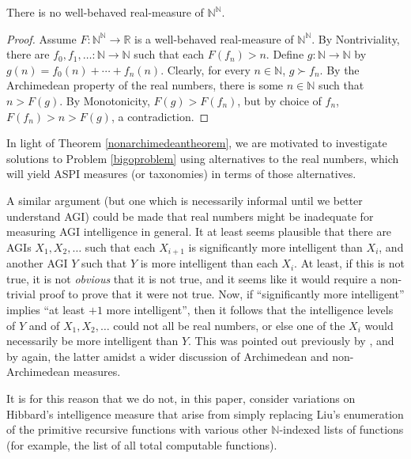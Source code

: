 \documentclass[twoside,11pt]{article}
\begin{document}
\begin{theorem}
\label{nonarchimedeantheorem}
    There is no well-behaved real-measure of $\mathbb N^\mathbb N$.
\end{theorem}

\begin{proof}
    Assume $F:\mathbb N^\mathbb N\to\mathbb R$ is a well-behaved real-measure
    of $\mathbb N^\mathbb N$.
    By Nontriviality, there are
    $f_0,f_1,\ldots:\mathbb N\to\mathbb N$
    such that each $F(f_n)>n$.
    Define $g:\mathbb N\to\mathbb N$ by $g(n)=f_0(n)+\cdots+f_n(n)$.
    Clearly, for every $n\in\mathbb N$, $g\succ f_{n}$.
    By the Archimedean property of the real numbers, there is some $n\in\mathbb N$
    such that $n>F(g)$. By Monotonicity, $F(g)>F(f_{n})$,
    but by choice of $f_{n}$, $F(f_{n})>n>F(g)$, a contradiction.
\end{proof}

In light of Theorem \ref{nonarchimedeantheorem}, we are motivated to investigate
solutions to Problem \ref{bigoproblem} using alternatives to the real numbers,
which will yield ASPI measures (or taxonomies) in terms of those alternatives.

A similar argument (but one which is necessarily informal until we better understand AGI)
could be made that real numbers might be inadequate for measuring
AGI intelligence in general. It at least seems plausible that there are AGIs $X_1,X_2,\ldots$
such that each $X_{i+1}$ is significantly more intelligent than $X_i$, and another AGI
$Y$ such that $Y$ is more intelligent than each $X_i$. At least, if this is not true,
it is not \emph{obvious} that it is not true, and it seems like it would require a
non-trivial proof to prove that it were not true. Now, if ``significantly more
intelligent'' implies ``at least $+1$ more intelligent'', then it follows that the
intelligence levels of $Y$ and of $X_1,X_2,\ldots$ could not all be real numbers,
or else one of the $X_i$ would necessarily be more intelligent than $Y$.
This was pointed out previously by \citet{ioi1},
and by \citet{alexander2020arch} again, the latter amidst a wider discussion of
Archimedean and non-Archimedean measures.

It is for this reason that we do not, in this paper, consider variations on Hibbard's
intelligence measure that arise from simply replacing Liu's enumeration of the primitive
recursive functions with various other $\mathbb N$-indexed lists of functions
(for example, the list of all total computable functions).
\end{document}

